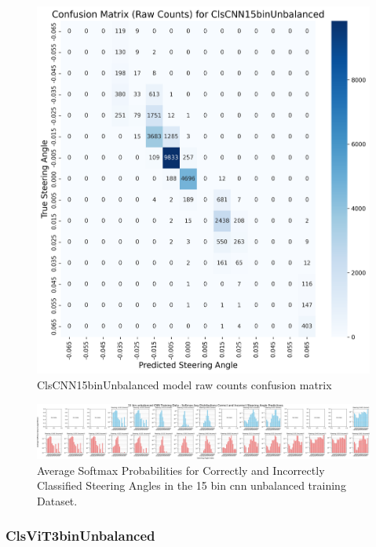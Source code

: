 \begin{figure}[H]
\centering
\includegraphics[width=1\linewidth]{Figures/Results/cm_raw_ClsCNN15binUnbalanced.png}
\caption{ClsCNN15binUnbalanced model raw counts confusion matrix}
\label{fig:cm_raw_ClsCNN15binUnbalanced}
\end{figure}

\begin{figure}[H]
    \centering
    \includegraphics[width=1\linewidth]{Figures/Results/15_bins_cnn_softmax_dist_plot_unbalanced.png}
    \caption{Average Softmax Probabilities for Correctly and Incorrectly Classified Steering Angles in the 15 bin cnn unbalanced training Dataset.}
    \label{fig:15_bins_cnn_softmax_dist_unbalanced}
\end{figure}


\subsubsection{ClsViT3binUnbalanced}

